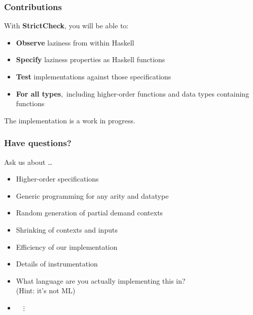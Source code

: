 \documentclass{beamer}
\begin{document}
\begin{frame}[fragile]
\frametitle{Contributions}
With \textbf{StrictCheck}, you will be able to:
\begin{itemize}
\item \textbf{Observe} laziness from within Haskell
\item \textbf{Specify} laziness properties as Haskell functions
\item \textbf{Test} implementations against those specifications
\item \textbf{For all types},\footnotemark\, including higher-order functions and
      data types containing functions
\end{itemize}
The implementation is a work in progress.
\end{frame}

\begin{frame}[fragile]
\frametitle{Have questions?}
Ask us about \dots
\begin{itemize}
\item Higher-order specifications
\item Generic programming for any arity and datatype
\item Random generation of partial demand contexts
\item Shrinking of contexts and inputs
\item Efficiency of our implementation
\item Details of instrumentation
\item What language are you actually implementing this in? \\ (Hint: it's not ML)
\item[] \ \ $\vdots$
\end{itemize}
\end{frame}
\end{document}
